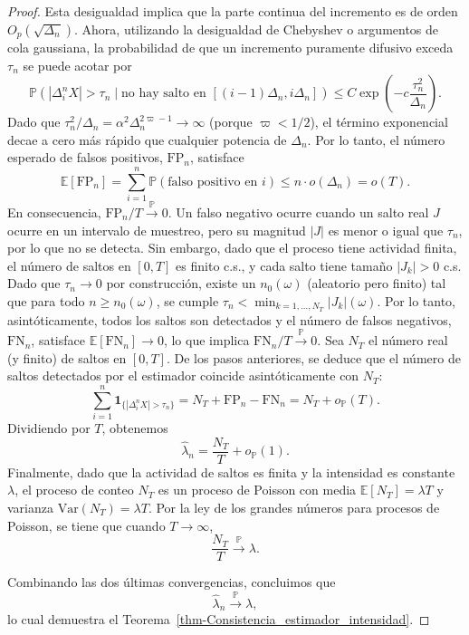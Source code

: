 \documentclass[
  spanish,
  us-letterpaper,
]{scrreprt}
\theoremstyle{plain}
\theoremstyle{plain}
\theoremstyle{definition}
\theoremstyle{remark}
\begin{document}
\begin{proof}
Esta desigualdad implica que la parte continua del incremento es de
orden \(O_p(\sqrt{\Delta_n})\). Ahora, utilizando la desigualdad de
Chebyshev o argumentos de cola gaussiana, la probabilidad de que un
incremento puramente difusivo exceda \(\tau_n\) se puede acotar por
\[\mathbb{P}(|\Delta_i^n X| > \tau_n \mid \text{no hay salto en } [(i-1)\Delta_n, i\Delta_n]) \leq C \exp\left( -c \frac{\tau_n^2}{\Delta_n} \right).\]
Dado que
\(\tau_n^2 / \Delta_n = \alpha^2 \Delta_n^{2\varpi-1} \to \infty\)
(porque \(\varpi < 1/2\)), el término exponencial decae a cero más
rápido que cualquier potencia de \(\Delta_n\). Por lo tanto, el número
esperado de falsos positivos, \(\mathrm{FP}_n\), satisface
\[\mathbb{E}[\mathrm{FP}_n] = \sum_{i=1}^n \mathbb{P}(\text{falso positivo en } i) \leq n \cdot o(\Delta_n) = o(T).\]
En consecuencia, \(\mathrm{FP}_n / T \xrightarrow{\mathbb{P}} 0\). Un
falso negativo ocurre cuando un salto real \(J\) ocurre en un intervalo
de muestreo, pero su magnitud \(|J|\) es menor o igual que \(\tau_n\),
por lo que no se detecta. Sin embargo, dado que el proceso tiene
actividad finita, el número de saltos en \([0,T]\) es finito c.s., y
cada salto tiene tamaño \(|J_k| > 0\) c.s. Dado que \(\tau_n \to 0\) por
construcción, existe un \(n_0(\omega)\) (aleatorio pero finito) tal que
para todo \(n \geq n_0(\omega)\), se cumple
\(\tau_n < \min_{k=1,\dots,N_T} |J_k|(\omega)\). Por lo tanto,
asintóticamente, todos los saltos son detectados y el número de falsos
negativos, \(\mathrm{FN}_n\), satisface
\(\mathbb{E}[\mathrm{FN}_n] \to 0\), lo que implica
\(\mathrm{FN}_n / T \xrightarrow{\mathbb{P}} 0\). Sea \(N_T\) el número
real (y finito) de saltos en \([0,T]\). De los pasos anteriores, se
deduce que el número de saltos detectados por el estimador coincide
asintóticamente con \(N_T\):
\[\sum_{i=1}^n \mathbf{1}_{\{ |\Delta_i^n X| > \tau_n \}} = N_T + \mathrm{FP}_n - \mathrm{FN}_n = N_T + o_{\mathbb{P}}(T).\]
Dividiendo por \(T\), obtenemos
\[\hat{\lambda}_n = \frac{N_T}{T} + o_{\mathbb{P}}(1).\] Finalmente,
dado que la actividad de saltos es finita y la intensidad es constante
\(\lambda\), el proceso de conteo \(N_T\) es un proceso de Poisson con
media \(\mathbb{E}[N_T] = \lambda T\) y varianza
\(\mathrm{Var}(N_T) = \lambda T\). Por la ley de los grandes números
para procesos de Poisson, se tiene que cuando \(T \to \infty\),
\[\frac{N_T}{T} \xrightarrow{\mathbb{P}} \lambda.\]

Combinando las dos últimas convergencias, concluimos que
\[\hat{\lambda}_n \xrightarrow{\mathbb{P}} \lambda,\] lo cual demuestra
el Teorema~\ref{thm-Consistencia_estimador_intensidad}.
\end{proof}
\end{document}
